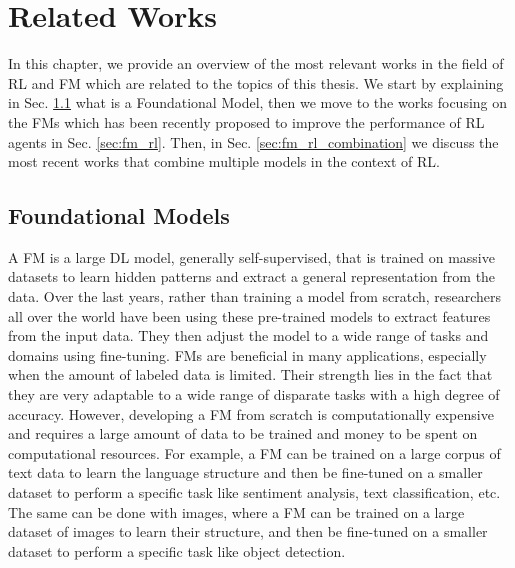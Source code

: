 
\chapter{Related Works}
\label{ch:related_work}
In this chapter, we provide an overview of the most relevant works in the field of RL and FM which are related to the topics of this thesis\@.
We start by explaining in Sec. \ref{sec:fm} what is a Foundational Model, then we move to the works focusing on the FMs which has been recently proposed to improve the performance of RL agents in Sec. \ref{sec:fm_rl}.
Then, in Sec. \ref{sec:fm_rl_combination} we discuss the most recent works that combine multiple models in the context of RL\@.

\section{Foundational Models}\label{sec:fm}



A FM is a large DL model, generally self-supervised, that is trained on massive datasets to learn hidden patterns and extract a general representation from the data.
Over the last years, rather than training a model from scratch, researchers all over the world have been using these pre-trained models to extract features from the input data.
They then adjust the model to a wide range of tasks and domains using fine-tuning.
FMs are beneficial in many applications, especially when the amount of labeled data is limited.
Their strength lies in the fact that they are very adaptable to a wide range of disparate tasks with a high degree of accuracy.
However, developing a FM from scratch is computationally expensive and requires a large amount of data to be trained and money to be spent on computational resources.
For example, a FM can be trained on a large corpus of text data to learn the language structure and then be fine-tuned on a smaller dataset to perform a specific task like sentiment analysis, text classification, etc.
The same can be done with images, where a FM can be trained on a large dataset of images to learn their structure, and then be fine-tuned on a smaller dataset to perform a specific task like object detection.

